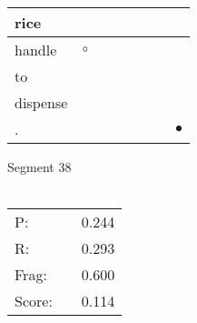 \documentclass[landscape]{article}
\newcommand{\ssp}{\hspace{2pt}}
\newcommand{\mex}{\cellcolor{g}$\bullet$}
\newcommand{\map}{\cellcolor{y}$\boldsymbol\circ$}
\begin{document}
\begin{tabular}{|l|p{10pt}|p{10pt}|p{10pt}|p{10pt}|p{10pt}|p{10pt}|p{10pt}|}
\hline
\ssp rice \ssp&\hspace{2pt}&\hspace{2pt}&\hspace{2pt}&\hspace{2pt}&\hspace{2pt}&\hspace{2pt}&\hspace{2pt}\\
\hline
\ssp \cellcolor{ref0}handle \ssp&\hspace{2pt}\map&\hspace{2pt}&\hspace{2pt}&\hspace{2pt}&\hspace{2pt}&\hspace{2pt}&\hspace{2pt}\\
\hline
\ssp to \ssp&\hspace{2pt}&\hspace{2pt}&\hspace{2pt}&\hspace{2pt}&\hspace{2pt}&\hspace{2pt}&\hspace{2pt}\\
\hline
\ssp dispense \ssp&\hspace{2pt}&\hspace{2pt}&\hspace{2pt}&\hspace{2pt}&\hspace{2pt}&\hspace{2pt}&\hspace{2pt}\\
\hline
\ssp \cellcolor{ref6}. \ssp&\hspace{2pt}&\hspace{2pt}&\hspace{2pt}&\hspace{2pt}&\hspace{2pt}&\hspace{2pt}&\hspace{2pt}\mex\\
\hline
\end{tabular}

\vspace{6pt}
\noindent Segment 38\\\\
\noindent\begin{tabular}{lm{12pt}r}
\hline
P:&&0.244\\
R:&&0.293\\
Frag:&&0.600\\
Score:&&0.114\\
\end{tabular}
\end{document}
